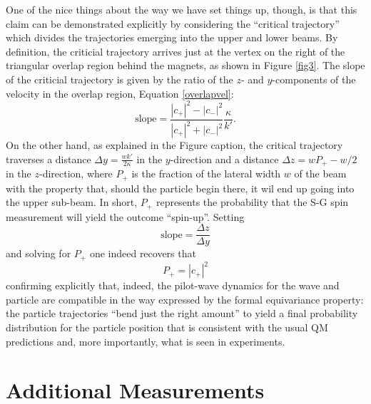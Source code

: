 \documentclass[aps,prc,onecolumn,letterpaper,floatfix,12pt]{revtex4}
\begin{document}
One of the nice things about the way we have set things up, though, is
that this claim can be demonstrated explicitly by considering the
``critical trajectory'' \cite{bh} which divides the trajectories emerging into
the upper and lower beams.  By definition, the criticial trajectory
arrives just at the vertex on the right of the triangular overlap
region behind the magnets, as shown in Figure \ref{fig3}. 
The slope of the criticial trajectory is given by the ratio of the
$z$- and $y$-components of the velocity in the overlap region,
Equation \eqref{overlapvel}:
\begin{equation}
\text{slope} = \frac{|c_+|^2 - |c_-|^2}{|c_+|^2+|c_-|^2}
\frac{\kappa}{k'}.
\end{equation}
On the other hand, as explained in the Figure caption, the critical
trajectory traverses a distance $\Delta y = \frac{w k'}{2 \kappa}$ in
the $y$-direction and a distance $\Delta z = wP_+ - w/2$ in the
$z$-direction, where $P_+$ is the fraction of the lateral width $w$ of
the beam with the property that, should the particle begin there, it
wil end up going into the upper sub-beam.  In short, $P_+$
represents the probability that the S-G spin measurement will yield
the outcome ``spin-up''.   Setting
\begin{equation}
\text{slope} = \frac{\Delta z}{\Delta y}
\end{equation}
and solving for $P_+$ one indeed recovers that
\begin{equation}
P_+ = |c_+|^2
\end{equation}
confirming explicitly that, indeed, the pilot-wave dynamics for the
wave and particle are compatible in the way expressed by the formal
equivariance property:  the particle trajectories ``bend just the
right amount'' to yield a final probability distribution for the
particle position that is consistent with the usual QM predictions
and, more importantly, what is seen in experiments. 



\section{Additional Measurements}
\label{sec4}
\end{document}
